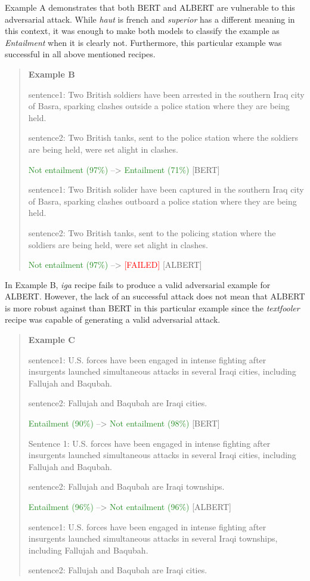 \documentclass{article}
\begin{document}
Example A demonstrates that both BERT and ALBERT are vulnerable to this adversarial attack. While \emph{haut} is french and \emph{superior} has a different meaning in this context, it was enough to make both models to classify the example as \emph{Entailment} when it is clearly not. Furthermore, this particular example was successful in all above mentioned recipes. 

\begin{quote}
\textbf{Example B}

sentence1: Two British soldiers have been arrested in the southern Iraq city of Basra, sparking clashes outside a police station where they are being held.

sentence2: Two British tanks, sent to the police station where the soldiers are being held, were set alight in clashes.

\textcolor{ForestGreen}{Not entailment (97\%)} --> \textcolor{ForestGreen}{Entailment (71\%)} [BERT] 

sentence1: Two British solider have been captured in the southern Iraq city of Basra, sparking clashes outboard a police station where they are being held.

sentence2: Two British tanks, sent to the policing station where the soldiers are being held, were set alight in clashes.

\textcolor{ForestGreen}{Not entailment (97\%)} --> \textcolor{Red}{[FAILED]} [ALBERT] 

\end{quote}

In Example B, \emph{iga} recipe fails to produce a valid adversarial example for ALBERT. However, the lack of an successful attack does not mean that ALBERT is more robust against than BERT in this particular example since the \emph{textfooler} recipe was capable of generating a valid adversarial attack.

\begin{quote}
\textbf{Example C}

sentence1: U.S. forces have been engaged in intense fighting after insurgents launched simultaneous attacks in several Iraqi cities, including Fallujah and Baqubah.

sentence2: Fallujah and Baqubah are Iraqi cities.

\textcolor{ForestGreen}{Entailment (90\%)} --> \textcolor{ForestGreen}{Not entailment (98\%)} [BERT] 

Sentence 1: U.S. forces have been engaged in intense fighting after insurgents launched simultaneous attacks in several Iraqi cities, including Fallujah and Baqubah.

sentence2: Fallujah and Baqubah are Iraqi townships.

\textcolor{ForestGreen}{Entailment (96\%)} --> \textcolor{ForestGreen}{Not entailment (96\%)} [ALBERT] 

sentence1: U.S. forces have been engaged in intense fighting after insurgents launched simultaneous attacks in several Iraqi townships, including Fallujah and Baqubah.

sentence2: Fallujah and Baqubah are Iraqi cities.

\end{quote}
\end{document}
